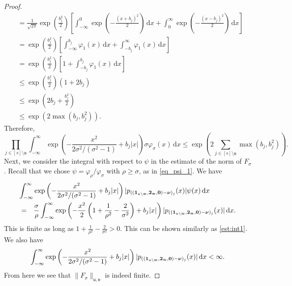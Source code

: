 \documentclass[namedate,webpdf,imanum]{ima-authoring-arxiv}%
\theoremstyle{thmstyletwo}%
\numberwithin{equation}{section}
\newcommand{\rd}{\, {\rm d}}
\newcommand{\bsnu}{\boldsymbol{\nu}}
\newcommand{\bszero}{\boldsymbol{0}}
\newcommand{\bsone}{\boldsymbol{1}}
\newcommand{\bstwo}{\boldsymbol{2}}
\newcommand{\uu}{\mathfrak{u}}
\newcommand{\vv}{\mathfrak{v}}
\newcommand{\ww}{\mathfrak{w}}
\begin{document}
\begin{proof}
\begin{align}
&= \frac{1}{\sqrt{2 \pi}} \exp\left(\frac{b_j^2}{2}\right) \left[\int_{-\infty}^0 \exp\left(-\frac{(x+b_j)^2}{2}\right) \,\mathrm{d} x + \int_0^{\infty} \exp\left(-\frac{(x-b_j)^2}{2}\right)   \,\mathrm{d} x\right]\nonumber\\
&= \exp\left(\frac{b_j^2}{2}\right) \left[\int_{-\infty}^{b_j} \varphi_1(x) \,\mathrm{d} x + \int_{-b_j}^{\infty} \varphi_1(x)   \,\mathrm{d} x\right]\nonumber\\
&= \exp\left(\frac{b_j^2}{2}\right) \left[1+\int_{-b_j}^{b_j} \varphi_1(x)   \,\mathrm{d} x\right]\nonumber\\
&\le \exp\left(\frac{b_j^2}{2}\right) (1+2 b_j)\nonumber\\
& \le \exp\left(2 b_j+\frac{b_j^2}{2}\right)\nonumber\\
& \le \exp\left(2 \max(b_j,b_j^2)\right).
\end{align}
Therefore, 
$$\prod_{j \in [s]\setminus \uu} \int_{-\infty}^{\infty} \exp\left(-\frac{x^2}{2 \sigma^2/(\sigma^2-1)} +b_j|x|\right) \sigma \varphi_{\sigma}(x) \,\mathrm{d} x \le \exp\left(2 \sum_{j \in [s]\setminus \uu} \max(b_j,b_j^2)\right).$$
Next, we consider the integral with respect to $\psi$ in the estimate of the norm of $F_{\sigma}$. Recall that we chose $\psi = \varphi_\rho/ \varphi_\sigma$ with $\rho \ge \sigma$, as in \eqref{eq_psi_1}. We have 
\begin{eqnarray*}
\lefteqn{\int_{-\infty}^{\infty} \exp\left(-\frac{x^2}{2 \sigma^2/(\sigma^2-1)} +b_j|x|\right) | p_{((\bsone_{\uu \setminus \ww},\bstwo_{\ww},\bszero) -\bsnu)_j}(x)|  \psi(x) \rd x}  \\ 
& = & \frac{\sigma}{\rho} \int_{-\infty}^\infty \exp\left(-\frac{x^2}{2} \left(1+ \frac{1}{\rho^2} - \frac{2}{\sigma^2} \right)  + b_j |x| \right) |p_{((\bsone_{\uu \setminus \ww},\bstwo_{\ww},\bszero) -\bsnu)_j}(x)|  \rd x.
\end{eqnarray*}
This is finite as long as $1 + \frac{1}{\rho^2} - \frac{2}{\sigma^2} > 0$. This can be shown similarly as \eqref{est:int1}. We also have 
\begin{equation*}%
\int_{-\infty}^{\infty}  \exp\left(-\frac{x^2}{2 \sigma^2/(\sigma^2-1)} +b_j|x|\right) |p_{((\bsone_{\uu \setminus \ww},\bstwo_{\ww},\bszero) -\bsnu)_j}(x)|  \rd x < \infty.
\end{equation*}
From here we see that $\|F_{\sigma}\|_{\uu,\vv}$ is indeed finite. \end{proof}
\end{document}
